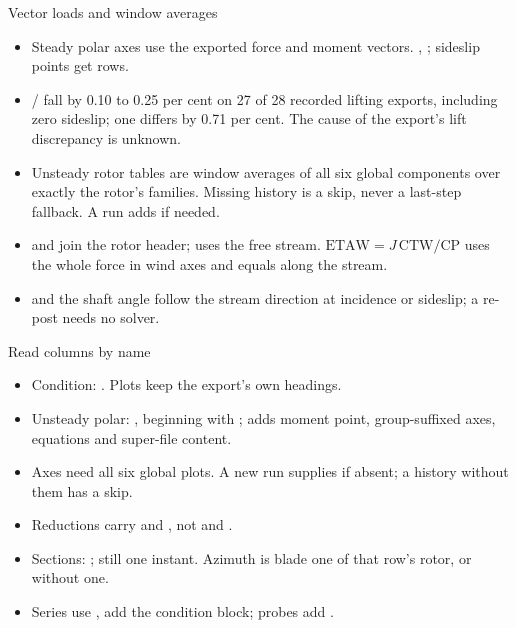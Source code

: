 \begin{frame}{Vector loads and window averages}
\begin{itemize}\small
\item Steady polar axes use the exported force and moment vectors.
, ; sideslip points get rows.
\item {}/ fall by 0.10 to 0.25 per cent on 27 of 28 recorded
lifting exports, including zero sideslip; one differs by 0.71 per cent.
The cause of the export's lift discrepancy is unknown.
\item Unsteady rotor tables are window averages of all six global
 components over exactly the rotor's families. Missing history is a
skip, never a last-step fallback. A run adds  if needed.
\item {} and  join the rotor header;
 uses the free stream. $\mathrm{ETAW}=J\,\mathrm{CTW}/\mathrm{CP}$
uses the whole force in wind axes and equals  along the stream.
\item {} and the shaft angle follow the stream direction at
incidence or sideslip; a re-post needs no solver.
\end{itemize}
\end{frame}

\begin{frame}{Read columns by name}
\begin{itemize}\small
\item Condition: 
. Plots keep the export's own headings.
\item Unsteady polar: , beginning with
; adds moment point, group-suffixed axes,
equations and super-file content.
\item Axes need all six global  plots. A new run supplies
 if absent; a history without them has a  skip.
\item Reductions carry  and , not
 and .
\item Sections: ; still one instant.
Azimuth is blade one of that row's rotor, or  without one.
\item Series use , add the condition block; probes add .
\end{itemize}
\end{frame}

